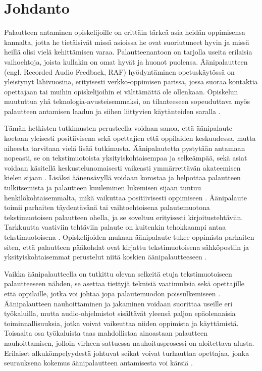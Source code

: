 \documentclass[utf8]{gradu3}
\begin{document}
\mainmatter

\chapter{Johdanto}

Palautteen antaminen opiskelijoille on erittäin tärkeä asia heidän oppimisensa kannalta, jotta he tietäisivät missä asioissa he ovat suoriutuneet hyvin ja missä heillä olisi vielä kehittämisen varaa. Palautteenantoon on tarjolla useita erilaisia vaihoehtoja, joista kullakin on omat hyvät ja huonot puolensa. Äänipalautteen (engl. Recorded Audio Feedback, RAF) hyödyntäminen opetuskäytössä on yleistynyt lähivuosina, erityisesti verkko-oppimisen parissa, jossa suoraa kontaktia opettajaan tai muihin opiskelijoihin ei välttämättä ole ollenkaan. Opiskelun muututtua yhä teknologia-avusteisemmaksi, on tilanteeseen sopeuduttava myös palautteen antamisen laadun ja siihen liittyvien käytänteiden saralla \parencite[][]{versus}.

Tämän hetkisten tutkimusten perusteella voidaan sanoa, että äänipalaute koetaan yleisesti positiivisena sekä opettajien että oppilaiden keskuudessa, mutta aiheesta tarvitaan vielä lisää tutkimusta. Äänipalautetta pystytään antamaan nopeasti, se on tekstimuotoista yksityiskohtaisempaa ja selkeämpää, sekä asiat voidaan käsitellä keskustelunomaisesti vaikeasti ymmärrettävän akateemisen kielen sijaan \parencite[][]{developing}. Lisäksi äänensävyllä voidaan korostaa ja helpottaa palautteen tulkitsemista ja palautteen kuuleminen lukemisen sijaan tuntuu henkilökohtaisemmalta, mikä vaikuttaa positiivisesti oppimiseen \parencite[][]{attitudes}. Äänipalaute toimii parhaiten täydentävänä tai vaihtoehtoisena palautemuotona tekstimuotoisen palautteen ohella, ja se soveltuu erityisesti kirjoitustehtäviin. Tarkkuutta vaativiin tehtäviin palaute on kuitenkin tehokkaampi antaa tekstimuotoisena \parencite[][]{academics}. Opiskelijoiden mukaan äänipalaute tukee oppimista parhaiten siten, että palautteen pääkohdat ovat kirjattu tekstimuotoisena sähköpostiin ja yksityiskohtaisemmat perustelut niitä koskien äänipalautteeseen \parencite[][]{using}.

Vaikka äänipalautteella on tutkittu olevan selkeitä etuja tekstimuotoiseen palautteeseen nähden, se asettaa tiettyjä teknisiä vaatimuksia sekä opettajille että oppilaille, jotka voi johtaa jopa palautemuodon poissulkemiseen \parencite[][]{developing}. Äänipalautteen nauhoittaminen ja jakaminen voidaan suorittaa useille eri työkaluilla, mutta audio-ohjelmistot sisältävät yleensä paljon epäolennaisia toiminnallisuuksia, jotka voivat vaikeuttaa niiden oppimista ja käyttämistä. Toisaalta osa työkaluista taas mahdollistaa ainoastaan palautteen nauhoittamisen, jolloin virheen sattuessa nauhoitusprosessi on aloitettava alusta. Erilaiset alkukömpelyydestä johtuvat seikat voivat turhauttaa opettajaa, jonka seurauksena kokemus äänipalautteen antamisesta voi kärsiä \parencite[][]{versus}.
\end{document}
